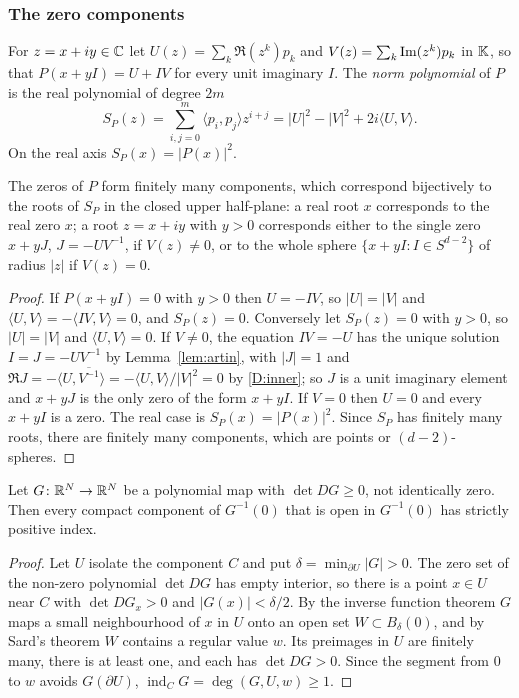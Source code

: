 \subsubsection{The zero components}

For $z=x+iy\in\mathbb{C}$ let $U(z)=\sum_k\Re(z^k)p_k$ and $V(z)=\sum_k\operatorname{Im}(z^k)p_k$ in $\mathbb{K}$, so that $P(x+yI)=U+IV$ for every unit imaginary $I$. The \emph{norm polynomial} of $P$ is the real polynomial of degree $2m$
\begin{equation}\label{eq:normpoly}
S_P(z)=\sum_{i,j=0}^m\langle p_i,p_j\rangle z^{i+j}=|U|^2-|V|^2+2i\langle U,V\rangle .
\end{equation}
On the real axis $S_P(x)=|P(x)|^2$.

\begin{lemma}\label{lem:components}
The zeros of $P$ form finitely many components, which correspond bijectively to the roots of $S_P$ in the closed upper half-plane: a real root $x$ corresponds to the real zero $x$; a root $z=x+iy$ with $y>0$ corresponds either to the single zero $x+yJ$, $J=-UV^{-1}$, if $V(z)\neq0$, or to the whole sphere $\{x+yI:I\in S^{d-2}\}$ of radius $|z|$ if $V(z)=0$.
\end{lemma}

\begin{proof}
If $P(x+yI)=0$ with $y>0$ then $U=-IV$, so $|U|=|V|$ and $\langle U,V\rangle=-\langle IV,V\rangle=0$, and $S_P(z)=0$. Conversely let $S_P(z)=0$ with $y>0$, so $|U|=|V|$ and $\langle U,V\rangle=0$. If $V\neq0$, the equation $IV=-U$ has the unique solution $I=J=-UV^{-1}$ by Lemma~\ref{lem:artin}, with $|J|=1$ and $\Re J=-\langle U,\overline{V^{-1}}\rangle=-\langle U,V\rangle/|V|^2=0$ by \ref{D:inner}; so $J$ is a unit imaginary element and $x+yJ$ is the only zero of the form $x+yI$. If $V=0$ then $U=0$ and every $x+yI$ is a zero. The real case is $S_P(x)=|P(x)|^2$. Since $S_P$ has finitely many roots, there are finitely many components, which are points or $(d-2)$-spheres.
\end{proof}

\begin{lemma}\label{lem:positiveindex}
Let $G\colon\mathbb{R}^N\to\mathbb{R}^N$ be a polynomial map with $\det DG\ge0$, not identically zero. Then every compact component of $G^{-1}(0)$ that is open in $G^{-1}(0)$ has strictly positive index.
\end{lemma}

\begin{proof}
Let $U$ isolate the component $C$ and put $\delta=\min_{\partial U}|G|>0$. The zero set of the non-zero polynomial $\det DG$ has empty interior, so there is a point $x\in U$ near $C$ with $\det DG_x>0$ and $|G(x)|<\delta/2$. By the inverse function theorem $G$ maps a small neighbourhood of $x$ in $U$ onto an open set $W\subset B_\delta(0)$, and by Sard's theorem $W$ contains a regular value $w$. Its preimages in $U$ are finitely many, there is at least one, and each has $\det DG>0$. Since the segment from $0$ to $w$ avoids $G(\partial U)$, $\operatorname{ind}_CG=\deg(G,U,w)\ge1$.
\end{proof}

